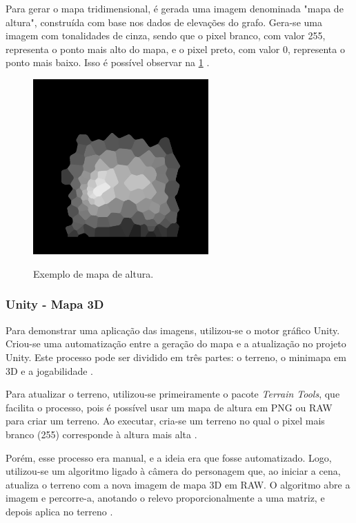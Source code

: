 Para gerar o mapa tridimensional, é gerada uma imagem denominada "mapa de altura", construída com base nos dados de elevações do grafo. Gera-se uma imagem com tonalidades de cinza, sendo que o pixel branco, com valor 255, representa o ponto mais alto do mapa, e o pixel preto, com valor 0, representa o ponto mais baixo. Isso é possível observar na \cref{fig:heightmap} \cite{planetzoo}.

\begin{figure}[!ht]
	\centering
    \caption{Exemplo de mapa de altura.}
	\includegraphics[width=0.6\textwidth]{figures/heightmap_eample.png}
	\label{fig:heightmap}
\end{figure}

\subsubsection{Unity - Mapa 3D}

Para demonstrar uma aplicação das imagens, utilizou-se o motor gráfico Unity. Criou-se uma automatização entre a geração do mapa e a atualização no projeto Unity. Este processo pode ser dividido em três partes: o terreno, o minimapa em 3D e a jogabilidade \cite{unitywebpage}.

Para atualizar o terreno, utilizou-se primeiramente o pacote \textit{Terrain Tools}, que facilita o processo, pois é possível usar um mapa de altura em PNG ou RAW para criar um terreno. Ao executar, cria-se um terreno no qual o pixel mais branco (255) corresponde à altura mais alta \cite{unity-terrain-tools}.

Porém, esse processo era manual, e a ideia era que fosse automatizado. Logo, utilizou-se um algoritmo ligado à câmera do personagem que, ao iniciar a cena, atualiza o terreno com a nova imagem de mapa 3D em RAW. O algoritmo abre a imagem e percorre-a, anotando o relevo proporcionalmente a uma matriz, e depois aplica no terreno \cite{unity-terrain-tools}.

